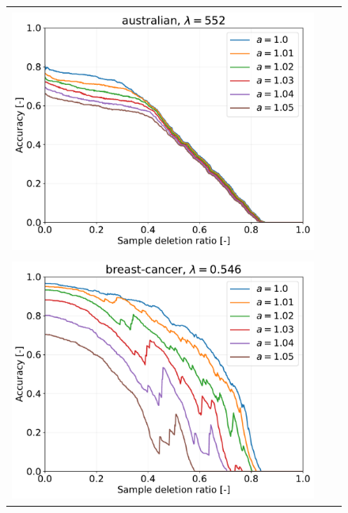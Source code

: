 \begin{figure}[H]
\begin{tabular}{ccc}
		\begin{minipage}[b]{0.3\hsize}\centering {\small Dataset: australian, $\lambda=n$}\\\includegraphics[width=0.8\hsize]{fig/table_logistic/australian-logistic/kernel/kernel_ss_screening_rate_lam552_x_n_y_etest.pdf}\end{minipage}
		\\
		\begin{minipage}[b]{0.3\hsize}\centering {\small Dataset: breast-cancer, $\lambda=n \cdot 10^{-3}$}\\\includegraphics[width=0.8\hsize]{fig/table_logistic/breast-cancer-logistic/kernel/kernel_ss_screening_rate_lam0.546_x_n_y_etest.pdf}\end{minipage}
		&

\end{tabular}
\end{figure}
